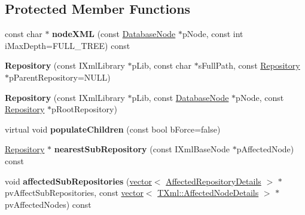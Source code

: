 \subsection*{\-Protected \-Member \-Functions}
\begin{DoxyCompactItemize}
\item 
\hypertarget{classgeneral__server_1_1Repository_a5562bf7a2b06f4b27b543910e514e701}{const char $\ast$ {\bfseries node\-X\-M\-L} (const \hyperlink{classgeneral__server_1_1DatabaseNode}{\-Database\-Node} $\ast$p\-Node, const int i\-Max\-Depth=\-F\-U\-L\-L\-\_\-\-T\-R\-E\-E) const }\label{classgeneral__server_1_1Repository_a5562bf7a2b06f4b27b543910e514e701}

\item 
\hypertarget{classgeneral__server_1_1Repository_a017dfd87407cf31d197ff6aeb4c5bda0}{{\bfseries \-Repository} (const \-I\-Xml\-Library $\ast$p\-Lib, const char $\ast$s\-Full\-Path, const \hyperlink{classgeneral__server_1_1Repository}{\-Repository} $\ast$p\-Parent\-Repository=\-N\-U\-L\-L)}\label{classgeneral__server_1_1Repository_a017dfd87407cf31d197ff6aeb4c5bda0}

\item 
\hypertarget{classgeneral__server_1_1Repository_a0cf520b61e83c926ca3c32883327adfe}{{\bfseries \-Repository} (const \-I\-Xml\-Library $\ast$p\-Lib, const \hyperlink{classgeneral__server_1_1DatabaseNode}{\-Database\-Node} $\ast$p\-Node, const \hyperlink{classgeneral__server_1_1Repository}{\-Repository} $\ast$p\-Root\-Repository)}\label{classgeneral__server_1_1Repository_a0cf520b61e83c926ca3c32883327adfe}

\item 
\hypertarget{classgeneral__server_1_1Repository_a0d9e46477dcfd904804042079c49425c}{virtual void {\bfseries populate\-Children} (const bool b\-Force=false)}\label{classgeneral__server_1_1Repository_a0d9e46477dcfd904804042079c49425c}

\item 
\hypertarget{classgeneral__server_1_1Repository_aef0c95c89250d5e6879000c33a9dcd9f}{\hyperlink{classgeneral__server_1_1Repository}{\-Repository} $\ast$ {\bfseries nearest\-Sub\-Repository} (const \-I\-Xml\-Base\-Node $\ast$p\-Affected\-Node) const }\label{classgeneral__server_1_1Repository_aef0c95c89250d5e6879000c33a9dcd9f}

\item 
\hypertarget{classgeneral__server_1_1Repository_aa9d62010ffe8cd4d34ca52667fb6dd4b}{void {\bfseries affected\-Sub\-Repositories} (\hyperlink{classvector}{vector}$<$ \hyperlink{structgeneral__server_1_1Repository_1_1AffectedRepositoryDetails}{\-Affected\-Repository\-Details} $>$ $\ast$pv\-Affect\-Sub\-Repositories, const \hyperlink{classvector}{vector}$<$ \hyperlink{structgeneral__server_1_1TXml_1_1AffectedNodeDetails}{\-T\-Xml\-::\-Affected\-Node\-Details} $>$ $\ast$pv\-Affected\-Nodes) const }\label{classgeneral__server_1_1Repository_aa9d62010ffe8cd4d34ca52667fb6dd4b}


\end{DoxyCompactItemize}
